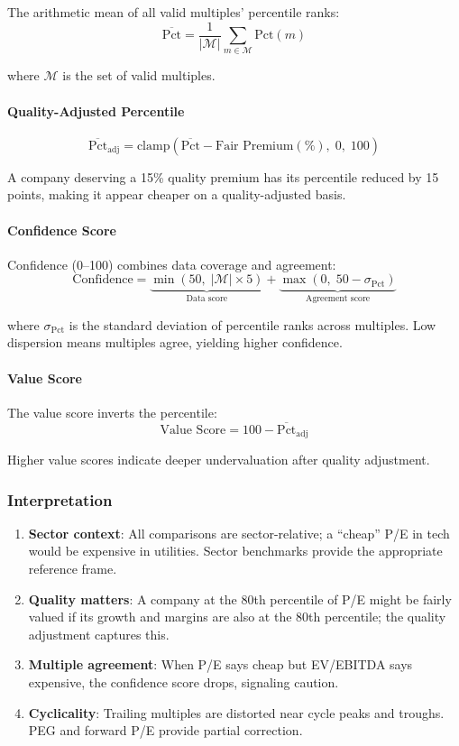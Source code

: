 The arithmetic mean of all valid multiples' percentile ranks:
\[
\overline{\text{Pct}} = \frac{1}{|\mathcal{M}|} \sum_{m \in \mathcal{M}} \text{Pct}(m)
\]

where $\mathcal{M}$ is the set of valid multiples.

\paragraph{Quality-Adjusted Percentile}

\[
\overline{\text{Pct}}_{\text{adj}} = \text{clamp}\!\left( \overline{\text{Pct}} - \text{Fair Premium}(\%), \; 0, \; 100 \right)
\]

A company deserving a 15\% quality premium has its percentile reduced by 15 points, making it appear cheaper on a quality-adjusted basis.

\paragraph{Confidence Score}

Confidence (0--100) combines data coverage and agreement:
\[
\text{Confidence} = \underbrace{\min(50, \; |\mathcal{M}| \times 5)}_{\text{Data score}} + \underbrace{\max(0, \; 50 - \sigma_{\text{Pct}})}_{\text{Agreement score}}
\]

where $\sigma_{\text{Pct}}$ is the standard deviation of percentile ranks across multiples. Low dispersion means multiples agree, yielding higher confidence.

\paragraph{Value Score}

The value score inverts the percentile:
\[
\text{Value Score} = 100 - \overline{\text{Pct}}_{\text{adj}}
\]

Higher value scores indicate deeper undervaluation after quality adjustment.

\subsubsection{Interpretation}

\begin{enumerate}
  \item \textbf{Sector context}: All comparisons are sector-relative; a ``cheap'' P/E in tech would be expensive in utilities. Sector benchmarks provide the appropriate reference frame.

  \item \textbf{Quality matters}: A company at the 80th percentile of P/E might be fairly valued if its growth and margins are also at the 80th percentile; the quality adjustment captures this.

  \item \textbf{Multiple agreement}: When P/E says cheap but EV/EBITDA says expensive, the confidence score drops, signaling caution.

  \item \textbf{Cyclicality}: Trailing multiples are distorted near cycle peaks and troughs. PEG and forward P/E provide partial correction.
\end{enumerate}

